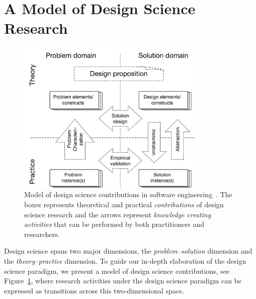 \documentclass[graybox]{svmult}
\newcommand{\emelie}[1]{\textcolor{red}{{\it [Emelie says: #1]}}}
\newcommand{\per}[1]{\textcolor{cyan}{{\it [Per says: #1]}}}
\newcommand{\emelie}[1]{}
\newcommand{\per}[1]{}
\begin{document}
\section{A Model of Design Science Research}
\label{sec:DesignScienceResearch}


\begin{figure}[t]
  \includegraphics[width=0.8\textwidth]{Figures/DS_model.pdf}
\caption{Model of design science contributions in software engineering~\cite{Engstrom19arxiv}. The boxes represents theoretical and practical \emph{contributions} of design science research and the arrows represent \emph{knowledge creating activities} that can be performed by both practitioners and researchers.}
\label{fig:DS_model}       %
\end{figure}

Design science spans two major dimensions, the \emph{problem--solution} dimension and the \emph{theory--practice} dimension. To guide our in-depth elaboration of the design science paradigm, we present a model of design science contributions, see Figure~\ref{fig:DS_model}, where research activities under the design science paradigm can be expressed as transitions across this two-dimensional space.
\end{document}
